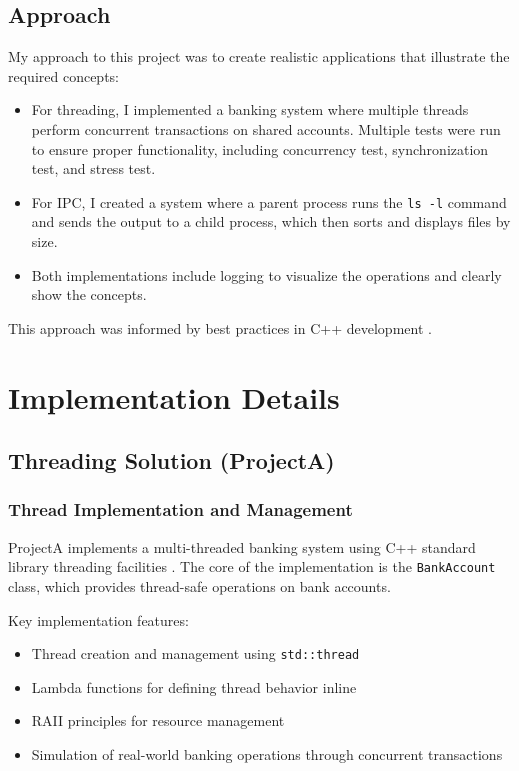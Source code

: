 \documentclass[12pt]{article}
\begin{document}
\subsection{Approach}
My approach to this project was to create realistic applications that illustrate the required concepts:

\begin{itemize}
    \item For threading, I implemented a banking system where multiple threads perform concurrent transactions on shared accounts. Multiple tests were run to ensure proper functionality, including concurrency test, synchronization test, and stress test.
    \item For IPC, I created a system where a parent process runs the \texttt{ls -l} command and sends the output to a child process, which then sorts and displays files by size.
    \item Both implementations include logging to visualize the operations and clearly show the concepts.
\end{itemize}

This approach was informed by best practices in C++ development \cite{cpp11_faq}.

\section{Implementation Details}
\subsection{Threading Solution (ProjectA)}
\subsubsection{Thread Implementation and Management}
ProjectA implements a multi-threaded banking system using C++ standard library threading facilities \cite{cpp_thread}. The core of the implementation is the \texttt{BankAccount} class, which provides thread-safe operations on bank accounts.

Key implementation features:
\begin{itemize}
    \item Thread creation and management using \texttt{std::thread}
    \item Lambda functions for defining thread behavior inline
    \item RAII \cite{cpp_raii} principles for resource management
    \item Simulation of real-world banking operations through concurrent transactions
\end{itemize}
\end{document}
